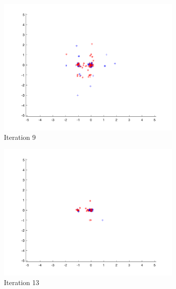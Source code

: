\begin{figure}
\begin{subfigure}[b]{0.4\textwidth}
    \includegraphics[width=\textwidth]{img/smpl/rast2d/loa-iter-9}
    \caption{Iteration 9}
    \label{fig:s4-iter-2}
  \end{subfigure}
  \begin{subfigure}[b]{0.4\textwidth}
    \includegraphics[width=\textwidth]{img/smpl/rast2d/loa-iter-13}
    \caption{Iteration 13}
    \label{fig:s4-iter-3}
  \end{subfigure}
  \begin{subfigure}[b]{0.4\textwidth}

\end{subfigure}
\end{figure}
